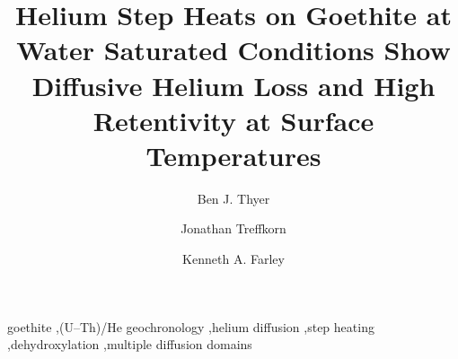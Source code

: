 \documentclass[preprint,12pt,review,authoryear]{elsarticle}
\begin{document}
\nolinenumbers 

\begin{frontmatter}
\title{Helium Step Heats on Goethite at Water Saturated Conditions Show Diffusive Helium Loss and High Retentivity at Surface Temperatures}
\author[caltech]{Ben J. Thyer}
\author[caltech]{Jonathan Treffkorn}
\author[caltech]{Kenneth A. Farley}
\begin{abstract}

\end{abstract}
\begin{keyword}
goethite \sep (U--Th)/He geochronology \sep helium diffusion \sep step heating \sep dehydroxylation \sep multiple diffusion domains
\end{keyword}
\end{frontmatter}





\end{document}
